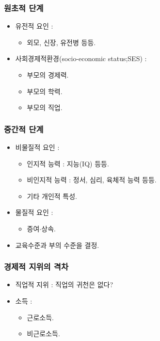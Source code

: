 \documentclass[aspectratio=169,xcolor=dvipsnames,handout]{beamer}
\begin{document}
\begin{frame}[<+->]
\frametitle{원초적 단계}
    \begin{itemize}
        \item 유전적 요인 : 
        \begin{itemize}
            \item 외모, 신장, 유전병 등등.
        \end{itemize}
        \item 사회경제적환경(socio-economic status;SES) :
        \begin{itemize}
            \item 부모의 경제력.
            \item 부모의 학력.
            \item 부모의 직업.
        \end{itemize}
    \end{itemize}
\end{frame}

\begin{frame}[<+->]
\frametitle{중간적 단계}
    \begin{itemize}
        \item 비물질적 요인 : 
        \begin{itemize}
            \item 인지적 능력 : 지능(IQ) 등등.
            \item 비인지적 능력 : 정서, 심리, 육체적 능력 등등.
            \item 기타 개인적 특성.
        \end{itemize}
        \item 물질적 요인 : 
        \begin{itemize}
            \item 증여$\cdot$상속.
        \end{itemize}
        \item 교육수준과 부의 수준을 결정.
    \end{itemize}
\end{frame}

\begin{frame}[<+->]
\frametitle{경제적 지위의 격차}
    \begin{itemize}
        \item 직업적 지위 : 직업의 귀천은 없다?
        \item 소득 : 
        \begin{itemize}
            \item 근로소득.
            \item 비근로소득.
        \end{itemize}
    \end{itemize}
\end{frame}
\end{document}
